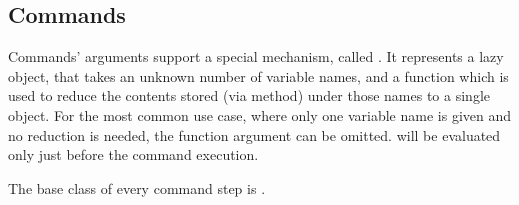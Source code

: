 \subsection{Commands}\label{subsec:steps_commands}
    Commands' arguments support a special mechanism, called
     \label{sec:DependentExpr} .
    It represents a lazy object, that takes an unknown number of variable names, and a function which is used to
    reduce the contents stored (via \hyperref[sec:set_variable]{} method)
    under those names to a single object.
    For the most common use case, where only one variable name is given and no reduction is needed, the function
    argument can be omitted.
     will be evaluated only just before the command execution.

The base class of every command step is .

\subsection*{}\label{subsec:CommandBase}

